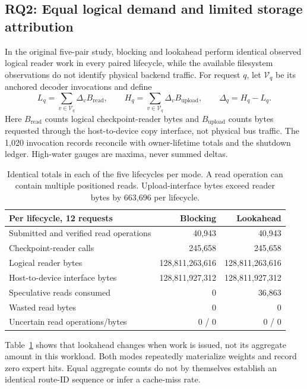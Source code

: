 \subsection{RQ2: Equal logical demand and limited storage attribution}
\label{sec:rq2}
In the original five-pair study, blocking and lookahead perform identical
observed logical reader work in every paired lifecycle, while the available
filesystem observations do not
identify physical backend traffic. For request $q$, let $\mathcal V_q$ be
its anchored decoder invocations and define
\begin{equation}
 L_q=\sum_{v\in\mathcal V_q}\Delta_v B_{\mathrm{read}},\qquad
 H_q=\sum_{v\in\mathcal V_q}\Delta_v B_{\mathrm{upload}},\qquad
 \Delta_q=H_q-L_q.
 \label{eq:request-io}
\end{equation}
Here $B_{\mathrm{read}}$ counts logical checkpoint-reader bytes and
$B_{\mathrm{upload}}$ counts bytes requested through the host-to-device copy
interface, not physical bus traffic. The 1,020 invocation records reconcile
with owner-lifetime totals and the shutdown ledger. High-water gauges are
maxima, never summed deltas.

\begin{table}[!htbp]
\centering
\small
\begin{tabularx}{\linewidth}{@{}>{\raggedright\arraybackslash}Xrr@{}}
\toprule
Per lifecycle, 12 requests & Blocking & Lookahead \\
\midrule
Submitted and verified read operations & 40,943 & 40,943 \\
Checkpoint-reader calls & 245,658 & 245,658 \\
Logical reader bytes & 128,811,263,616 & 128,811,263,616 \\
Host-to-device interface bytes & 128,811,927,312 & 128,811,927,312 \\
Speculative reads consumed & 0 & 36,863 \\
Wasted read bytes & 0 & 0 \\
Uncertain read operations/bytes & 0 / 0 & 0 / 0 \\
\bottomrule
\end{tabularx}
\caption{Identical totals in each of the five lifecycles per mode. A read
operation can contain multiple positioned reads. Upload-interface bytes
exceed reader bytes by 663,696 per lifecycle.}
\label{tab:paired-work}
\end{table}

Table~\ref{tab:paired-work} shows that lookahead changes when work is issued,
not its aggregate amount in this workload. Both modes repeatedly materialize
weights and record zero expert hits. Equal aggregate counts do not by
themselves establish an identical route-ID sequence or infer a cache-miss rate.

